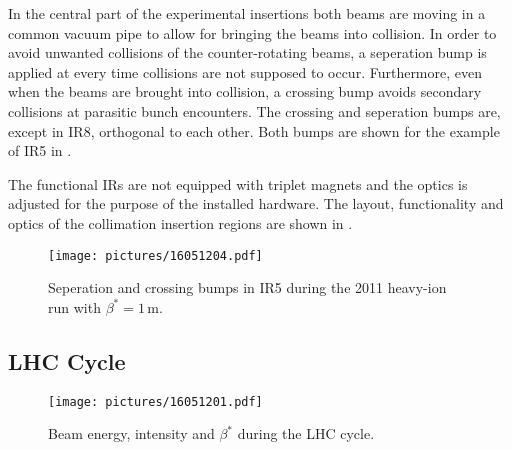 In the central part of the experimental insertions both beams are moving in a common vacuum pipe to allow for bringing the beams into collision. In order to avoid unwanted collisions of the counter-rotating beams, a seperation bump is applied at every time collisions are not supposed to occur. Furthermore, even when the beams are brought into collision, a crossing bump avoids secondary collisions at parasitic bunch encounters.  The crossing and seperation bumps are, except in IR8, orthogonal to each other. Both bumps are shown for the example of IR5 in .



The functional IRs are not equipped with triplet magnets and the optics is adjusted for the purpose of the installed hardware. The layout, functionality and optics of the collimation insertion regions are shown in . 
%
%
%
\begin{figure}[htbp]  
    \centering
    \texttt{[image: pictures/16051204.pdf]}
    \caption{Seperation and crossing bumps in IR5 during the 2011 heavy-ion run with $\beta^*=1\,$m.}  
    \label{pic:16051204}
\end{figure}
%
%


\subsection{LHC Cycle} \label{chap:lhccycle}
% 
\begin{figure}[b]  
    \centering
    \texttt{[image: pictures/16051201.pdf]}
    \caption{Beam energy, intensity and $\beta^*$ during the LHC cycle.}  
    \label{pic:16040801}
\end{figure}
%

